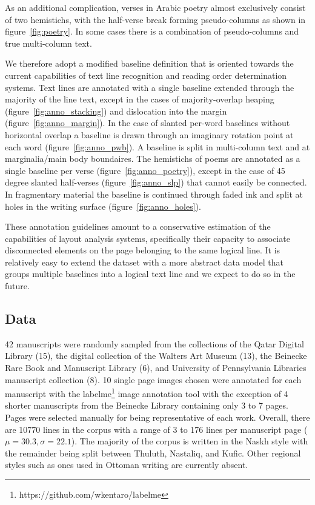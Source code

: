 As an additional complication, verses in Arabic poetry almost exclusively
consist of two hemistichs, with the half-verse break forming pseudo-columns as
shown in figure~\ref{fig:poetry}. In some cases there is a combination of
pseudo-columns and true multi-column text.

We therefore adopt a modified baseline definition that is oriented towards the
current capabilities of text line recognition and reading order determination
systems. Text lines are annotated with a single baseline extended through the
majority of the line text, except in the cases of majority-overlap heaping
(figure~\ref{fig:anno_stacking}) and dislocation into the margin (figure~\ref{fig:anno_margin}).
In the case of slanted per-word baselines without horizontal overlap a baseline
is drawn through an imaginary rotation point at each word (figure~\ref{fig:anno_pwb}). A
baseline is split in multi-column text and at marginalia/main body boundaires.
The hemistichs of poems are annotated as a single baseline per verse
(figure~\ref{fig:anno_poetry}), except in the case of 45 degree slanted half-verses
(figure~\ref{fig:anno_slp}) that cannot easily be connected. In fragmentary material the
baseline is continued through faded ink and split at holes in the writing
surface (figure~\ref{fig:anno_holes}).

These annotation guidelines amount to a conservative estimation of the
capabilities of layout analysis systems, specifically their capacity to
associate disconnected elements on the page belonging to the same logical line.
It is relatively easy to extend the dataset with a more abstract data model
that groups multiple baselines into a logical text line and we expect to do so
in the future.


\subsection{Data}


42 manuscripts were randomly sampled from the collections of the Qatar Digital
Library (15), the digital collection of the Walters Art Museum (13), the
Beinecke Rare Book and Manuscript Library (6), and University of Pennsylvania
Libraries manuscript collection (8). 10 single page images chosen were
annotated for each manuscript with the
labelme\footnote{https://github.com/wkentaro/labelme} image annotation tool
with the exception of 4 shorter manuscripts from the Beinecke Library
containing only 3 to 7 pages. Pages were selected manually for being
representative of each work. Overall, there are 10770 lines in the corpus with
a range of 3 to 176 lines per manuscript page ($\mu = 30.3, \sigma = 22.1$).
The majority of the corpus is written in the Naskh style with the remainder
being split between Thuluth, Nastaliq, and Kufic. Other regional styles such as
ones used in Ottoman writing are currently absent.

